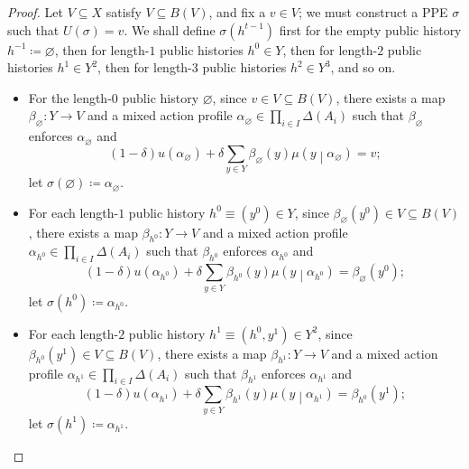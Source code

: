 \begin{proof}
	Let $V \subseteq X$ satisfy $V \subseteq B(V)$, and fix a $v \in V$; we must construct a PPE $\sigma$ such that $U(\sigma) = v$. We shall define $\sigma\left( h^{t-1} \right)$ first for the empty public history $h^{-1} \coloneqq \varnothing$, then for length-$1$ public histories $h^0 \in Y$, then for length-$2$ public histories $h^1 \in Y^2$, then for length-$3$ public histories $h^2 \in Y^3$, and so on.

	\begin{itemize}
	
		\item For the length-$0$ public history $\varnothing$, since $v \in V \subseteq B(V)$, there exists a map $\beta_{\varnothing} : Y \to V$ and a mixed action profile $\alpha_{\varnothing} \in \prod_{i \in I} \Delta(A_i)$ such that $\beta_{\varnothing}$ enforces $\alpha_{\varnothing}$ and
		\begin{equation*}
			(1-\delta) u\left(\alpha_{\varnothing}\right)
			+ \delta \sum_{y \in Y} \beta_{\varnothing}(y) \mu\left(y\middle|\alpha_{\varnothing}\right) 
			= v ;
		\end{equation*}
		let $\sigma\left( \varnothing \right) \coloneqq \alpha_{\varnothing}$.
	
		\item For each length-$1$ public history $h^0 \equiv \left(y^0\right) \in Y$, since $\beta_{\varnothing}\left( y^0 \right) \in V \subseteq B(V)$, there exists a map $\beta_{h^0} : Y \to V$ and a mixed action profile $\alpha_{h^0} \in \prod_{i \in I} \Delta(A_i)$ such that $\beta_{h^0}$ enforces $\alpha_{h^0}$ and
		\begin{equation*}
			(1-\delta) u\left(\alpha_{h^0}\right)
			+ \delta \sum_{y \in Y} \beta_{h^0}(y) \mu\left(y\middle|\alpha_{h^0}\right) 
			= \beta_{\varnothing}\left( y^0 \right) ;
		\end{equation*}
		let $\sigma\left( h^0 \right) \coloneqq \alpha_{h^0}$.
	
		\item For each length-$2$ public history $h^1 \equiv \left(h^0,y^1\right) \in Y^2$, since $\beta_{h^0}\left( y^1 \right) \in V \subseteq B(V)$, there exists a map $\beta_{h^1} : Y \to V$ and a mixed action profile $\alpha_{h^1} \in \prod_{i \in I} \Delta(A_i)$ such that $\beta_{h^1}$ enforces $\alpha_{h^1}$ and
		\begin{equation*}
			(1-\delta) u\left(\alpha_{h^1}\right)
			+ \delta \sum_{y \in Y} \beta_{h^1}(y) \mu\left(y\middle|\alpha_{h^1}\right) 
			= \beta_{h^0}\left( y^1 \right) ;
		\end{equation*}
		let $\sigma\left( h^1 \right) \coloneqq \alpha_{h^1}$.
	

\end{itemize}
\end{proof}
